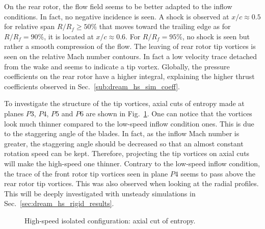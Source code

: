 On the rear rotor, the flow field seems to be better adapted to
the inflow conditions. In fact, no negative incidence is seen.
A shock is observed at $x/c \approx 0.5$ for relative span
$R / R_f \geq 50 \%$ that moves toward the trailing edge as
for $R / R_f = 90 \%$, it is located at $x/c \approx 0.6$.
For $R / R_f = 95 \%$, no shock is seen but rather a smooth
compression of the flow. The leaving of rear rotor tip vortices
is seen on the relative Mach number contours. In fact a low
velocity trace detached from the wake and seems to indicate
a tip vortex. Globally, the pressure coefficients on the 
rear rotor have a higher integral, explaining
the higher thrust coefficients observed in Sec.~\ref{sub:dream_hs_sim_coeff}.

To investigate the structure of the tip vortices, axial
cuts of entropy made at planes $P3$, $P4$, $P5$ and $P6$
are shown in Fig.~\ref{fig:dream_HS_steady_entropy}. One can notice
that the vortices look much thinner compared to the
low-speed inflow condition ones. This is due to the
staggering angle of the blades. In fact, as the inflow 
Mach number is greater, the staggering angle should be
decreased so that an almost constant rotation speed can be kept.
Therefore, projecting the tip vortices on axial cuts will make
the high-speed one thinner. Contrary to the low-speed
inflow condition, the trace of the front rotor tip vortices
seen in plane $P4$ seems to pass above the rear rotor tip
vortices. This was also observed when looking at the radial profiles.
This will be deeply investigated with unsteady simulations
in Sec.~\ref{sec:dream_hs_rigid_results}.
\begin{figure}[htp]
  \centering
  \caption{High-speed isolated configuration: axial cut of entropy.}
   \label{fig:dream_HS_steady_entropy}
\end{figure}